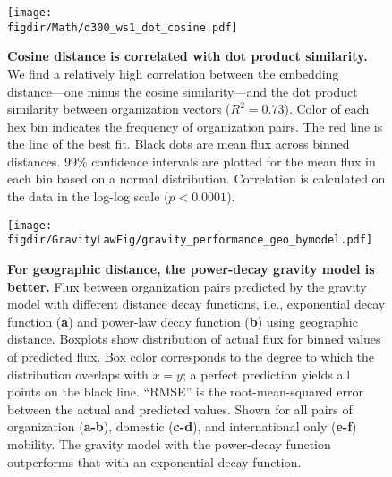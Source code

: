 \documentclass[12pt]{article} %
\def\figdir{../Figs}
\begin{document}
%
%
\begin{figure}[p!]
	\centering
	\texttt{[image: \\figdir/Math/d300\_ws1\_dot\_cosine.pdf]}
	\caption{
		\textbf{Cosine distance is correlated with dot product similarity.}
		We find a relatively high correlation between the embedding distance---one minus the cosine similarity---and the dot product similarity between organization vectors ($R^2 = 0.73$).
		Color of each hex bin indicates the frequency of organization pairs. 
				The red line is the line of the best fit.
		Black dots are mean flux across binned distances.
		99\% confidence intervals are plotted for the mean flux in each bin based on a normal distribution. 
		Correlation is calculated on the data in the log-log scale ($p < 0.0001$).
	}
	\label{fig:supp:cosdot}
\end{figure}



%
%
\begin{figure}[p!]
	\centering
	\texttt{[image: \\figdir/GravityLawFig/gravity\_performance\_geo\_bymodel.pdf]}
	\caption{
		\textbf{For geographic distance, the power-decay gravity model is better.}
		Flux between organization pairs predicted by the gravity model with different distance decay functions, i.e., exponential decay function (\textbf{a}) and power-law decay function (\textbf{b}) using geographic distance.
		Boxplots show distribution of actual flux for binned values of predicted flux.
		Box color corresponds to the degree to which the distribution overlaps with $x = y$; 
		a perfect prediction yields all points on the black line.
		``RMSE'' is the root-mean-squared error between the actual and predicted values.
		Shown for all pairs of organization (\textbf{a-b}), domestic (\textbf{c-d}), and international only (\textbf{e-f}) mobility.
		The gravity model with the power-decay function outperforms that with an exponential decay function.
	}
	\label{fig:supp:predict_geo_bymodel}
\end{figure}
\end{document}
